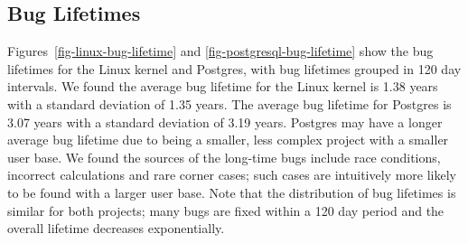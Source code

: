 
\subsection{Bug Lifetimes}
\label{sec-bug-lifetime}
Figures~\ref{fig-linux-bug-lifetime} and
\ref{fig-postgresql-bug-lifetime} show the bug lifetimes for the Linux
kernel and Postgres, with bug lifetimes grouped in 120 day
intervals. We found the average bug lifetime for the Linux kernel is
1.38 years with a standard deviation of 1.35 years. The average bug
lifetime for Postgres is 3.07 years with a standard deviation of 3.19
years. Postgres may have a longer average bug lifetime due to being a
smaller, less complex project with a smaller user base. We found the
sources of the long-time bugs include race conditions, incorrect
calculations and rare corner cases; such cases are intuitively more
likely to be found with a larger user base.  Note that the
distribution of bug lifetimes is similar for both projects; many bugs
are fixed within a 120 day period and the overall lifetime decreases
exponentially.

